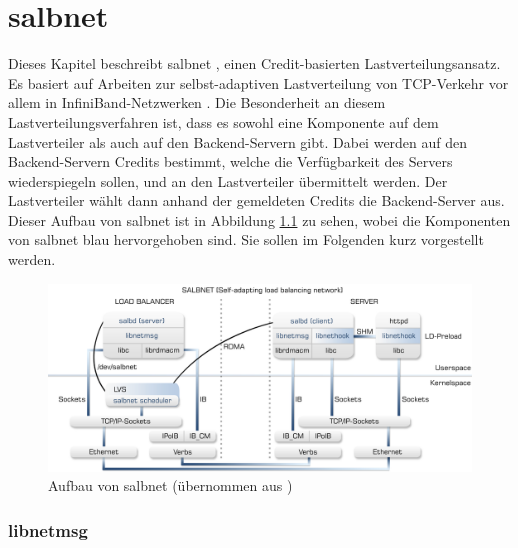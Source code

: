 \documentclass[a4paper, 12pt, BCOR10mm, DIV12, toc=bibliography, toc=listof, german]{scrbook}
\begin{document}


	\chapter{salbnet} %
	\label{cha:salbnet}

		Dieses Kapitel beschreibt salbnet \cite{salbnet}, einen Credit-basierten
		Lastverteilungsansatz.  Es basiert auf Arbeiten zur selbst-adaptiven Lastverteilung von
		TCP-Verkehr vor allem in InfiniBand-Netzwerken \cite{zinke2007, scsczile2008,
		schneidenbach2009}. Die Besonderheit an diesem Lastverteilungsverfahren ist, dass es sowohl eine
		Komponente auf dem Lastverteiler als auch auf den Backend-Servern gibt. Dabei werden auf den
		Backend-Servern Credits bestimmt, welche die Verfügbarkeit des Servers wiederspiegeln sollen,
		und an den Lastverteiler übermittelt werden. Der Lastverteiler wählt dann anhand der gemeldeten
		Credits die Backend-Server aus. Dieser Aufbau von salbnet ist in Abbildung \ref{fig:salbnet} zu
		sehen, wobei die Komponenten von salbnet blau hervorgehoben sind. Sie sollen im Folgenden kurz
		vorgestellt werden.

		\begin{figure}
			\centering
			\includegraphics[width=\textwidth]{images/salbnet.png}
			\caption{Aufbau von salbnet (übernommen aus \cite{zinke2012})}
			\label{fig:salbnet}
		\end{figure}

		\subsection*{libnetmsg} %
\end{document}
